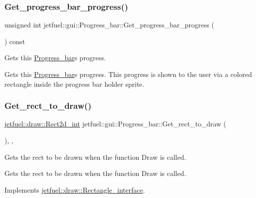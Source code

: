 \subsubsection{\texorpdfstring{Get\+\_\+progress\+\_\+bar\+\_\+progress()}{Get\_progress\_bar\_progress()}}
{\footnotesize\ttfamily unsigned int jetfuel\+::gui\+::\+Progress\+\_\+bar\+::\+Get\+\_\+progress\+\_\+bar\+\_\+progress (\begin{DoxyParamCaption}{ }\end{DoxyParamCaption}) const\hspace{0.3cm}{\ttfamily [inline]}}



Gets this \hyperlink{classjetfuel_1_1gui_1_1Progress__bar}{Progress\+\_\+bar}\textquotesingle{}s progress. 

Gets this \hyperlink{classjetfuel_1_1gui_1_1Progress__bar}{Progress\+\_\+bar}\textquotesingle{}s progress. This progress is shown to the user via a colored rectangle inside the progress bar holder sprite. \mbox{\label{classjetfuel_1_1gui_1_1Progress__bar_a4a09c3d515c9754b8295a4b5d83291ff}} 
\subsubsection{\texorpdfstring{Get\+\_\+rect\+\_\+to\+\_\+draw()}{Get\_rect\_to\_draw()}}
{\footnotesize\ttfamily \hyperlink{classjetfuel_1_1draw_1_1Rect2d}{jetfuel\+::draw\+::\+Rect2d\+\_\+int} jetfuel\+::gui\+::\+Progress\+\_\+bar\+::\+Get\+\_\+rect\+\_\+to\+\_\+draw (\begin{DoxyParamCaption}{ }\end{DoxyParamCaption})\hspace{0.3cm}{\ttfamily [inline]}, {\ttfamily [override]}, {\ttfamily [virtual]}}



Gets the rect to be drawn when the function Draw is called. 

Gets the rect to be drawn when the function Draw is called. 

Implements \hyperlink{classjetfuel_1_1draw_1_1Rectangle__interface_a03fd3b6842ab7b3065379caec407296f}{jetfuel\+::draw\+::\+Rectangle\+\_\+interface}.


